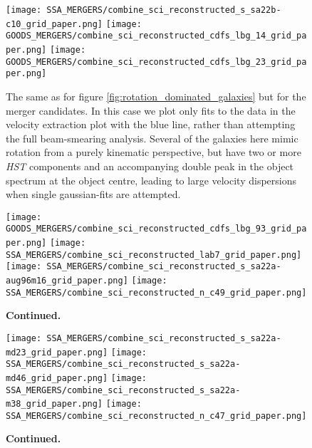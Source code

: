 \documentclass[fleqn,usenatbib]{mnras}
\begin{document}
\begin{figure*}
    \centering

    \texttt{[image: SSA\_MERGERS/combine\_sci\_reconstructed\_s\_sa22b-c10\_grid\_paper.png]}
    \texttt{[image: GOODS\_MERGERS/combine\_sci\_reconstructed\_cdfs\_lbg\_14\_grid\_paper.png]}
    \texttt{[image: GOODS\_MERGERS/combine\_sci\_reconstructed\_cdfs\_lbg\_23\_grid\_paper.png]}

    \caption{The same as for figure \protect\ref{fig:rotation_dominated_galaxies} but for the merger candidates.
    In this case we plot only fits to the data in the velocity extraction plot with the blue line, rather than attempting the full beam-smearing analysis.
    Several of the galaxies here mimic rotation from a purely kinematic perspective, but have two or more {\em HST} components and an accompanying double peak in the object spectrum at the object centre, leading to large velocity dispersions when single gaussian-fits are attempted.}
    \label{fig:merger_galaxies}
\end{figure*}

\begin{figure*}\ContinuedFloat
    \centering

    \texttt{[image: GOODS\_MERGERS/combine\_sci\_reconstructed\_cdfs\_lbg\_93\_grid\_paper.png]}
    \texttt{[image: SSA\_MERGERS/combine\_sci\_reconstructed\_lab7\_grid\_paper.png]}
    \texttt{[image: SSA\_MERGERS/combine\_sci\_reconstructed\_s\_sa22a-aug96m16\_grid\_paper.png]}
    \texttt{[image: SSA\_MERGERS/combine\_sci\_reconstructed\_n\_c49\_grid\_paper.png]}    

    \caption{\textbf{Continued.}}

\end{figure*}

\begin{figure*}\ContinuedFloat
    \centering

    \texttt{[image: SSA\_MERGERS/combine\_sci\_reconstructed\_s\_sa22a-md23\_grid\_paper.png]}
    \texttt{[image: SSA\_MERGERS/combine\_sci\_reconstructed\_s\_sa22a-md46\_grid\_paper.png]}
    \texttt{[image: SSA\_MERGERS/combine\_sci\_reconstructed\_s\_sa22a-m38\_grid\_paper.png]}    
    \texttt{[image: SSA\_MERGERS/combine\_sci\_reconstructed\_n\_c47\_grid\_paper.png]}

    \caption{\textbf{Continued.}}

\end{figure*}
\end{document}
